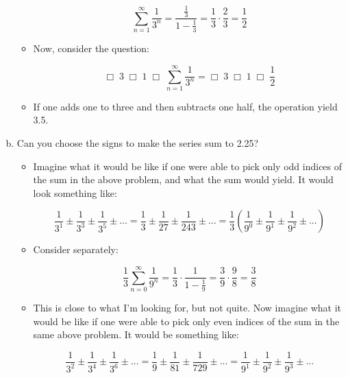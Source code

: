 \documentclass[11pt]{article}
\begin{document}
\begin{enumerate}[a)]
\begin{itemize}
	\begin{equation*}
	\sum_{n = 1}^{\infty} \frac{1}{3^n} = \frac{\frac{1}{3}}{1 - \frac{1}{3}} = \frac{1}{3} \cdot \frac{2}{3} = \frac{1}{2}
	\end{equation*}
	
	\item Now, consider the question:
	
	\begin{equation*}
	\Box \; 3 \; \Box \; 1 \; \Box \; \sum_{n = 1}^{\infty} \frac{1}{3^n} = \Box \; 3 \; \Box \; 1 \; \Box \; \frac{1}{2}
	\end{equation*}
	
	\item If one adds one to three and then subtracts one half, the operation yield 3.5.
	
\end{itemize}

\clearpage

\item Can you choose the signs to make the series sum to 2.25?

\begin{itemize}

	\item Imagine what it would be like if one were able to pick only odd indices of the sum in the above problem, and what the sum would yield.
	It would look something like:
	
	\begin{equation*}
	\frac{1}{3^1} \pm \frac{1}{3^3} \pm \frac{1}{3^5} \pm ... = \frac{1}{3} \pm \frac{1}{27} \pm \frac{1}{243} \pm ... = 
	\frac{1}{3} \left(\frac{1}{9^0} \pm \frac{1}{9^1} \pm \frac{1}{9^2} \pm ... \right)
	\end{equation*}

	\item Consider separately:
	
	\begin{equation*}
	\frac{1}{3} \sum_{n = 0}^{\infty} \frac{1}{9^n} = \frac{1}{3} \cdot \frac{1}{1 - \frac{1}{9}} = \frac{3}{9} \cdot \frac{9}{8} = \frac{3}{8}
	\end{equation*}
	
	\item This is close to what I'm looking for, but not quite. 
	Now imagine what it would be like if one were able to pick only even indices of the sum in the same above problem.
	It would be something like:
	
	\begin{equation*}
	\frac{1}{3^2} \pm \frac{1}{3^4} \pm \frac{1}{3^6} \pm ... = \frac{1}{9} \pm \frac{1}{81} \pm \frac{1}{729} \pm ... = 
	\frac{1}{9^1} \pm \frac{1}{9^2} \pm \frac{1}{9^3} \pm ...
	\end{equation*}
	

\end{itemize}
\end{enumerate}
\end{document}
